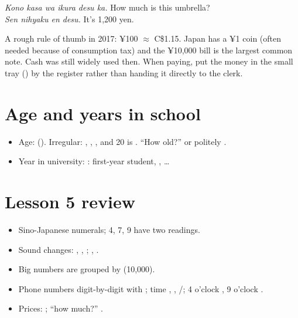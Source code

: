 \begin{example}
 \emph{Kono kasa wa ikura desu ka.} How much is this
umbrella?\\
 \emph{Sen nihyaku en desu.} It's 1,200 yen.
\end{example}

\begin{aside}
A rough rule of thumb in 2017: ¥100 $\approx$ C\$1.15. Japan has a ¥1 coin (often
needed because of consumption tax) and the ¥10,000 bill is the largest common note.
Cash was still widely used then. When paying, put the money in the small tray
() by the register rather than handing it directly to the clerk.
\end{aside}

\section{Age and years in school}
\begin{itemize}
  \item Age:  (). Irregular: , ,
        , and 20 is . ``How old?''  or politely
        .
  \item Year in university: :  first-year student,
        , \ldots
\end{itemize}

\section*{Lesson 5 review}
\begin{itemize}
  \item Sino-Japanese numerals; 4, 7, 9 have two readings.
  \item Sound changes: , , ; ,
        .
  \item Big numbers are grouped by  (10{,}000).
  \item Phone numbers digit-by-digit with ; time , ,
        /; 4 o'clock , 9 o'clock .
  \item Prices: ; ``how much?'' .
\end{itemize}
